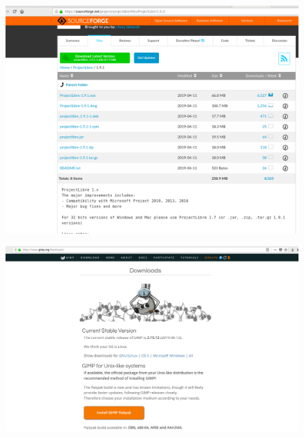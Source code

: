 \documentclass{fancyslides}
\begin{document}
\begin{frame}
	
	\begin{figure}
		\centering
		\includegraphics[width=1\linewidth]{images/projectlibre2}
		\label{fig:projectlibre2}
	\end{figure}
	
\end{frame}

\begin{frame}
\begin{figure}
	\centering
	\includegraphics[width=1\linewidth]{images/gimp1}
	\label{fig:gimp1}
\end{figure}
	
\end{frame}
\end{document}
